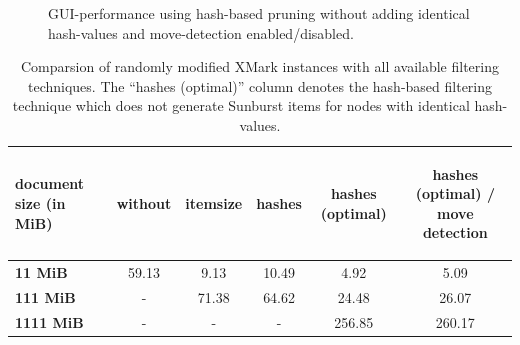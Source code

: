 \begin{figure}[tb]
\caption{\label{fig:gui-performance-movedet} GUI-performance using hash-based pruning without adding identical hash-values and move-detection enabled/disabled.}
\end{figure}

\begin{table}[tb]
\centering 
\begin{tabular}[r]{|l|c|c|c|c|c|} 
\hline
\textbf{document size (in MiB)} & \begin{sideways}\textbf{without}\end{sideways} & \begin{sideways}\textbf{itemsize}\end{sideways} & \begin{sideways}\textbf{hashes}\end{sideways} & \begin{sideways}\textbf{hashes (optimal)}\end{sideways} & \begin{sideways}\textbf{hashes (optimal) / move detection}\end{sideways}\\
\hline
\hline
\textbf{11 MiB} & 59.13 & 9.13 & 10.49 & 4.92 & 5.09\\
\hline
\textbf{111 MiB} & - & 71.38 & 64.62 & 24.48 & 26.07\\
\hline
\textbf{1111 MiB} & - & - & - & 256.85 & 260.17\\
\hline
\end{tabular}
\label{chap3:comparison}
\vspace{0.5em} 
\caption{Comparsion of randomly modified XMark instances with all available filtering techniques. The ``hashes (optimal)'' column denotes the hash-based filtering technique which does not generate Sunburst items for nodes with identical hash-values.}
\end{table}


